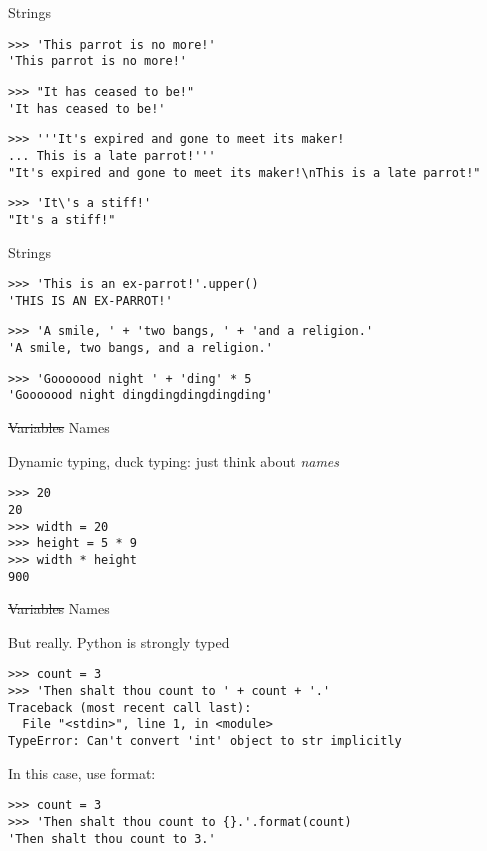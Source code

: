 \documentclass[ignorenonframetext,]{beamer}
\begin{document}
\begin{frame}[fragile]{Strings}
    \begin{verbatim}
>>> 'This parrot is no more!'
'This parrot is no more!'
    \end{verbatim}

    \pause
    \begin{verbatim}
>>> "It has ceased to be!"
'It has ceased to be!'
    \end{verbatim}

    \pause
    \begin{verbatim}
>>> '''It's expired and gone to meet its maker!
... This is a late parrot!'''
"It's expired and gone to meet its maker!\nThis is a late parrot!"
    \end{verbatim}

    \pause
    \begin{verbatim}
>>> 'It\'s a stiff!'
"It's a stiff!"
    \end{verbatim}
\end{frame}

\begin{frame}[fragile]{Strings}
    \begin{verbatim}
>>> 'This is an ex-parrot!'.upper()
'THIS IS AN EX-PARROT!'
    \end{verbatim}

    \pause
    \begin{verbatim}
>>> 'A smile, ' + 'two bangs, ' + 'and a religion.'
'A smile, two bangs, and a religion.'
    \end{verbatim}

    \pause
    \begin{verbatim}
>>> 'Gooooood night ' + 'ding' * 5
'Gooooood night dingdingdingdingding'
    \end{verbatim}
\end{frame}

\begin{frame}[fragile]{\st{Variables} Names}

    Dynamic typing, duck typing: just think about \emph{names}

    \begin{verbatim}
>>> 20
20
>>> width = 20
>>> height = 5 * 9
>>> width * height
900
    \end{verbatim}
\end{frame}

\begin{frame}[fragile]{\st{Variables} Names}

    But really. Python is strongly typed

    \begin{verbatim}
>>> count = 3
>>> 'Then shalt thou count to ' + count + '.'
Traceback (most recent call last):
  File "<stdin>", line 1, in <module>
TypeError: Can't convert 'int' object to str implicitly
    \end{verbatim}

    \pause
    In this case, use format:
    \begin{verbatim}
>>> count = 3
>>> 'Then shalt thou count to {}.'.format(count)
'Then shalt thou count to 3.'
    \end{verbatim}
\end{frame}
\end{document}
